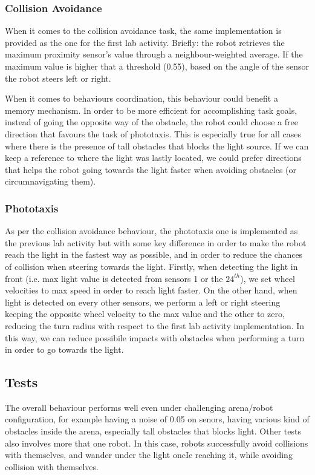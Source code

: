 \subsubsection{Collision Avoidance}
When it comes to the collision avoidance task, the same implementation is
provided as the one for the first lab activity. Briefly: the robot retrieves
the maximum proximity sensor's value through a neighbour-weighted average. If
the maximum value is higher that a threshold (0.55), based on the angle of the
sensor the robot steers left or right.

When it comes to behaviours coordination, this behaviour could benefit a memory
mechanism. In order to be more efficient for accomplishing task goals, instead
of going the opposite way of the obstacle, the robot could choose a free
direction that favours the task of phototaxis. This is especially true for all
cases where there is the presence of tall obstacles that blocks the light
source. If we can keep a reference to where the light was lastly located, we
could prefer directions that helps the robot going towards the light faster
when avoiding obstacles (or circumnavigating them).

\subsubsection{Phototaxis}
As per the collision avoidance behaviour, the phototaxis one is implemented as
the previous lab activity but with some key difference in order to make the
robot reach the light in the fastest way as possible, and in order to reduce
the chances of collision when steering towards the light. Firstly, when
detecting the light in front (i.e. max light value is detected from sensors 1
or the $24^{th}$), we set wheel velocities to max speed in order to reach light
faster. On the other hand, when light is detected on every other sensors, we
perform a left or right steering keeping the opposite wheel velocity to the max
value and the other to zero, reducing the turn radius with respect to the first
lab activity implementation. In this way, we can reduce possibile impacts with
obstacles when performing a turn in order to go towards the light.


\subsection{Tests}
The overall behaviour performs well even under challenging arena/robot
configuration, for example having a noise of 0.05 on senors, having various
kind of obstacles inside the arena, especially tall obstacles that blocks
light. Other tests also involves more that one robot. In this case, robots
successfully avoid collisions with themselves, and wander under the light oncIe
reaching it, while avoiding collision with themselves.
